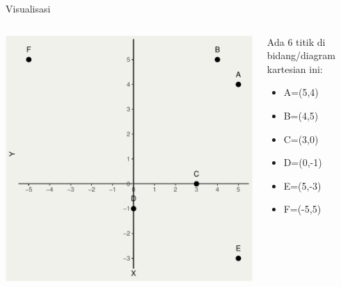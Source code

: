 \documentclass[
  ignorenonframetext,
]{beamer}
\providecommand{\tightlist}{%
  \setlength{\itemsep}{0pt}\setlength{\parskip}{0pt}}\usepackage{longtable,booktabs,array}
\begin{document}
\begin{frame}{Visualisasi}
\label{visualisasi-1}
\begin{columns}[T]
\begin{column}{0.47\textwidth}
\includegraphics{index_files/figure-beamer/unnamed-chunk-1-1.pdf}
\end{column}

\begin{column}{0.48\textwidth}
Ada 6 titik di bidang/diagram kartesian ini:

\begin{itemize}[<+->]
\tightlist
\item
  A=(5,4)
\item
  B=(4,5)
\item
  C=(3,0)
\item
  D=(0,-1)
\item
  E=(5,-3)
\item
  F=(-5,5)
\end{itemize}
\end{column}
\end{columns}
\end{frame}
\end{document}
